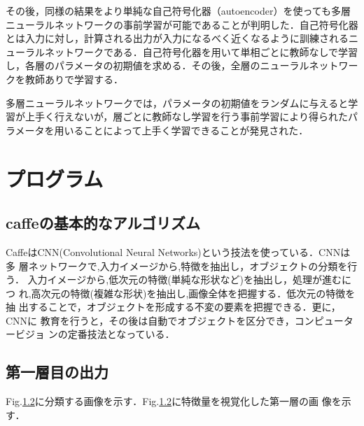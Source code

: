 \documentclass[a4paper,10pt]{jsarticle}
\begin{document}
その後，同様の結果をより単純な自己符号化器（autoencoder）を使っても多層ニューラルネットワークの事前学習が可能であることが判明した．自己符号化器とは入力に対し，計算される出力が入力になるべく近くなるように訓練されるニューラルネットワークである．自己符号化器を用いて単相ごとに教師なしで学習し，各層のパラメータの初期値を求める．その後，全層のニューラルネットワークを教師ありで学習する．

多層ニューラルネットワークでは，パラメータの初期値をランダムに与えると学習が上手く行えないが，層ごとに教師なし学習を行う事前学習により得られたパラメータを用いることによって上手く学習できることが発見された．
\section{プログラム}

\subsection{caffeの基本的なアルゴリズム}
CaffeはCNN(Convolutional Neural Networks)という技法を使っている．CNNは多
層ネットワークで,入力イメージから,特徴を抽出し，オブジェクトの分類を行う．
入力イメージから,低次元の特徴(単純な形状など)を抽出し，処理が進むにつ
れ,高次元の特徴(複雑な形状)を抽出し,画像全体を把握する．低次元の特徴を抽
出することで，オブジェクトを形成する不変の要素を把握できる．更に，CNNに
教育を行うと，その後は自動でオブジェクトを区分でき，コンピュータービジョ
ンの定番技法となっている．\\

\subsection{第一層目の出力}
Fig.\ref{}に分類する画像を示す．Fig.\ref{}に特徴量を視覚化した第一層の画
像を示す．

\end{document}
